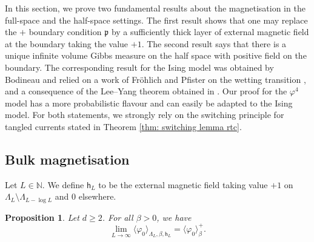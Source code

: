\documentclass[11pt,a4paper]{article}
\newtheorem{proposition}[theorem]{Proposition}
\theoremstyle{definition}
\numberwithin{equation}{section}
\begin{document}
In this section, we prove two fundamental results about the magnetisation in the full-space and the half-space settings. The first result shows that one may replace the $+$ boundary condition $\mathfrak{p}$ by a sufficiently thick layer of external magnetic field at the boundary taking the value $+1$. The second result says that there is a unique infinite volume Gibbs measure on the half space with positive field on the boundary. The corresponding result for the Ising model was obtained by Bodineau \cite{Bod05} and relied on a work of Fröhlich and Pfister on the wetting transition \cite{FP87}, and a consequence of the Lee--Yang theorem obtained in \cite{MMP84}. Our proof for the $\varphi^4$ model has a more probabilistic flavour and can easily be adapted to the Ising model. For both statements, we strongly rely on the switching principle for tangled currents stated in Theorem \ref{thm: switching lemma rtc}. 



\subsection{Bulk magnetisation}

Let $L\in \mathbb N$. We define $\mathsf{h}_L$ to be the external magnetic field taking value $+1$ on 
$\Lambda_{L}\setminus \Lambda_{L-\log L}$
and $0$ elsewhere.

\begin{proposition}\label{prop: thick conv} Let $d\geq 2$. For all $\beta >0$, we have
\begin{equation}
    \lim_{L\rightarrow \infty} \langle \varphi_0\rangle_{\Lambda_{L},\beta,\mathsf{h}_L}=\langle \varphi_0\rangle^+_\beta.
\end{equation}
\end{proposition}
\end{document}
